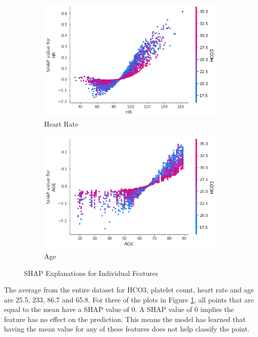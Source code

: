\documentclass[12pt]{article}
\begin{document}
\begin{figure}[H]
\begin{subfigure}[b]{0.47\textwidth}
         \includegraphics[width=\linewidth]{Vanilla SHAP Global/Vanilla SHAP Global for HR.png}
         \caption{Heart Rate}
     \end{subfigure}
     \hfill
     \begin{subfigure}[b]{0.47\textwidth}
         \centering
         \includegraphics[width=\linewidth]{Vanilla SHAP Global/Vanilla SHAP Global for AGE.png}
         \caption{Age}
     \end{subfigure}
     \caption{SHAP Explanations for Individual Features}
        \label{Vanilla SHAP Global Features}
\end{figure}

The average from the entire dataset for HCO3, platelet count, heart rate and age are 25.5, 233, 86.7 and 65.8. For three of the plots in Figure \ref{Vanilla SHAP Global Features}, all points that are equal to the mean have a SHAP value of 0. A SHAP value of 0 implies the feature has no effect on the prediction. This means the model has learned that having the mean value for any of these features does not help classify the point.
\end{document}
